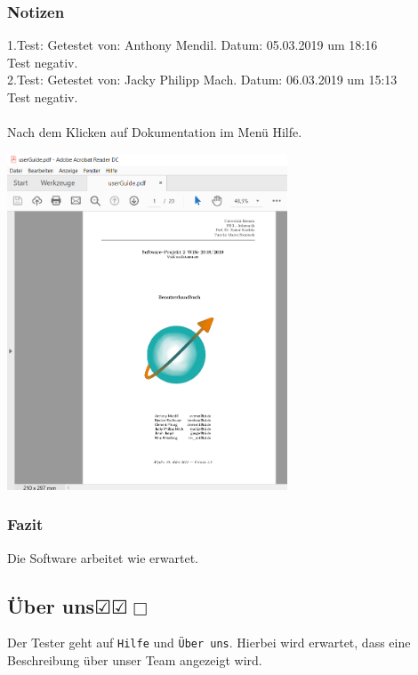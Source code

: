 \documentclass[enabledeprecatedfontcommands]{scrartcl}
\newcommand{\subsectiont}[2]{\subsection[#1]{#1{\normalsize\normalfont #2}}}
\newcommand{\leer}{$\Box$}
\newcommand{\ok}{$\CheckedBox$}
\begin{document}
\subsubsection{Notizen}
1.Test: Getestet von: Anthony Mendil. Datum:  05.03.2019 um 18:16\\
Test negativ.\\
2.Test: Getestet von: Jacky Philipp Mach. Datum: 06.03.2019 um 15:13\\
Test negativ.\\\\
Nach dem Klicken auf Dokumentation im Menü Hilfe.
\begin{center}
\includegraphics[height=10cm]{userguide.png}
\end{center}
\subsubsection{Fazit}
Die Software arbeitet wie erwartet.

\subsectiont{Über uns}{\dotfill\ok\ok\leer}
Der Tester geht auf \texttt{Hilfe} und \texttt{Über uns}. Hierbei wird erwartet, dass eine Beschreibung über unser Team angezeigt wird.
\end{document}
